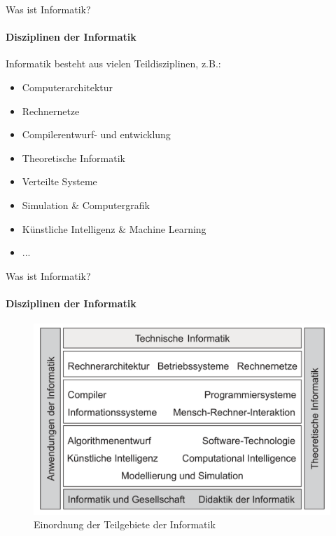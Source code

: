     \begin{frame}{Was ist Informatik?}
        \framesubtitle{Disziplinen der Informatik}
        Informatik besteht aus vielen Teildisziplinen, z.B.:
        \begin{itemize}
            \item Computerarchitektur
            \item Rechnernetze
            \item Compilerentwurf- und entwicklung
            \item Theoretische Informatik
            \item Verteilte Systeme
            \item Simulation \& Computergrafik
            \item Künstliche Intelligenz \& Machine Learning
            \item ...
        \end{itemize}
    \end{frame}
    
    \begin{frame}{Was ist Informatik?}
        \framesubtitle{Disziplinen der Informatik}
        \begin{figure}
            \centering
            \includegraphics[width=\linewidth,height=0.6\textheight,keepaspectratio]{chapters/02_computer_science/figures/informatik_einordnung.png}
            \caption{Einordnung der Teilgebiete der Informatik \cite{Muller2015}}
            \label{fig:my_label}
        \end{figure}
    \end{frame}
        
    
